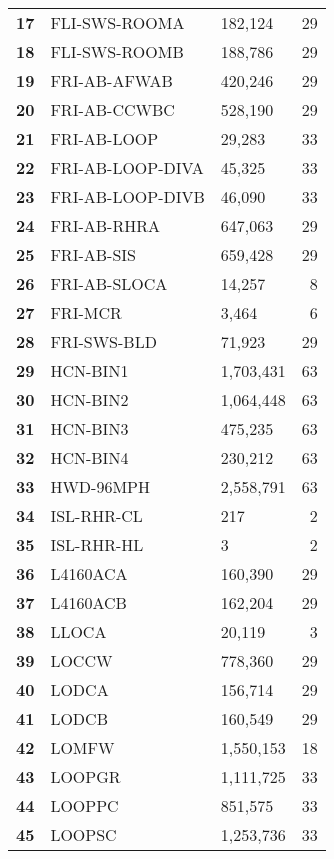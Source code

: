 \begin{longtable}{@{}rllr@{}}
\textbf{17} & FLI-SWS-ROOMA    & 182,124   & 29 \\
\textbf{18} & FLI-SWS-ROOMB    & 188,786   & 29 \\
\textbf{19} & FRI-AB-AFWAB     & 420,246   & 29 \\
\textbf{20} & FRI-AB-CCWBC     & 528,190   & 29 \\
\textbf{21} & FRI-AB-LOOP      & 29,283    & 33 \\
\textbf{22} & FRI-AB-LOOP-DIVA & 45,325    & 33 \\
\textbf{23} & FRI-AB-LOOP-DIVB & 46,090    & 33 \\
\textbf{24} & FRI-AB-RHRA      & 647,063   & 29 \\
\textbf{25} & FRI-AB-SIS       & 659,428   & 29 \\
\textbf{26} & FRI-AB-SLOCA     & 14,257    & 8  \\
\textbf{27} & FRI-MCR          & 3,464     & 6  \\
\textbf{28} & FRI-SWS-BLD      & 71,923    & 29 \\
\textbf{29} & HCN-BIN1         & 1,703,431 & 63 \\
\textbf{30} & HCN-BIN2         & 1,064,448 & 63 \\
\textbf{31} & HCN-BIN3         & 475,235   & 63 \\
\textbf{32} & HCN-BIN4         & 230,212   & 63 \\
\textbf{33} & HWD-96MPH        & 2,558,791 & 63 \\
\textbf{34} & ISL-RHR-CL       & 217       & 2  \\
\textbf{35} & ISL-RHR-HL       & 3         & 2  \\
\textbf{36} & L4160ACA         & 160,390   & 29 \\
\textbf{37} & L4160ACB         & 162,204   & 29 \\
\textbf{38} & LLOCA            & 20,119    & 3  \\
\textbf{39} & LOCCW            & 778,360   & 29 \\
\textbf{40} & LODCA            & 156,714   & 29 \\
\textbf{41} & LODCB            & 160,549   & 29 \\
\textbf{42} & LOMFW            & 1,550,153 & 18 \\
\textbf{43} & LOOPGR           & 1,111,725 & 33 \\
\textbf{44} & LOOPPC           & 851,575   & 33 \\
\textbf{45} & LOOPSC           & 1,253,736 & 33 \\

\end{longtable}

